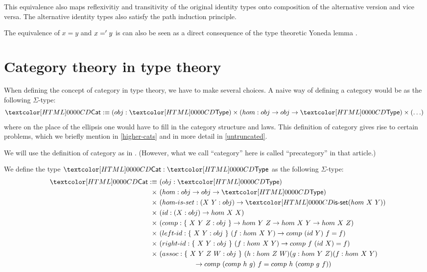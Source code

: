 This equivalence also maps reflexivitiy and transitivity of the
original identity types onto composition of the alternative version
and vice versa. The alternative identity types also satisfy the path
induction principle.

The equivalence of $x = y$ and $x =' y$ is can also be seen as a
direct consequence of the type theoretic Yoneda lemma
\cite{Rijke2012}.

\section{Category theory in type theory}

When defining the concept of category in type theory, we have to make
several choices. A naive way of defining a category would be as the
following $\Sigma$-type:
$$
\Cat \ddefeq (obj : \Type) \times (hom : obj \to obj \to \Type) \times (\hdots)
$$
where on the place of the ellipsis one would have to fill in the
category structure and laws. This definition of category gives rise to
certain problems, which we briefly mention in \cref{higher-cats} and
in more detail in \cref{untruncated}.

We will use the definition of category as in
\cite{Ahrens2015}. (However, what we call ``category'' here is called
``precategory'' in that article.)

\begin{definition}[Category]
  We define the type $\Cat : \Type$ as the following $\Sigma$-type:
  \begin{align*}
    &&\Cat \ddefeq &\ (obj : \Type) \\
         &&\times  &\ (hom : obj \to obj \to \Type) \\
         &&\times  &\ (\identalt{hom-is-set} : (X\ Y : obj) \to \isset (hom\ X\ Y)) \\
         &&\times  &\ (id : (X : obj) \to hom\ X\ X) \\
         &&\times  &\ (comp : \{\ X\ Y\ Z : obj\ \} \to hom\ Y\ Z \to hom\ X\ Y \to hom\ X\ Z) \\
         &&\times  &\ (\identalt{left-id} : \{\ X\ Y : obj\ \}\ (f : hom\ X\ Y) \to comp\ (id\ Y)\ f = f) \\
         &&\times  &\ (\identalt{right-id} : \{\ X\ Y : obj\ \}\ (f : hom\ X\ Y) \to comp\ f\ (id\ X) = f) \\
         &&\times  &\ (assoc : \{\ X\ Y\ Z\ W : obj\ \}\ (h : hom\ Z\ W) (g : hom\ Y\ Z) (f : hom\ X\ Y) \\
         && &\ \ \ \ \ \ \ \ \ \ \ \ \ \ \ \ \to comp\ (comp\ h\ g)\ f = comp\ h\ (comp\ g\ f))
  \end{align*}
\end{definition}

